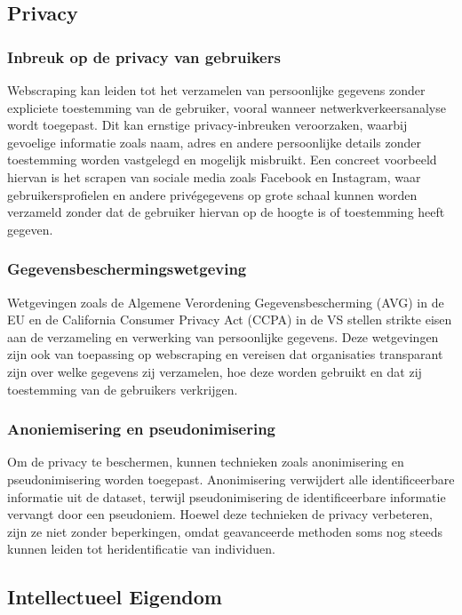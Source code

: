 \subsection{Privacy}
\subsubsection{Inbreuk op de privacy van gebruikers}
Webscraping kan leiden tot het verzamelen van persoonlijke gegevens zonder expliciete toestemming van de gebruiker, vooral wanneer netwerkverkeersanalyse wordt toegepast. Dit kan ernstige privacy-inbreuken veroorzaken, waarbij gevoelige informatie zoals naam, adres en andere persoonlijke details zonder toestemming worden vastgelegd en mogelijk misbruikt. Een concreet voorbeeld hiervan is het scrapen van sociale media zoals Facebook en Instagram, waar gebruikersprofielen en andere privégegevens op grote schaal kunnen worden verzameld zonder dat de gebruiker hiervan op de hoogte is of toestemming heeft gegeven.


\subsubsection{Gegevensbeschermingswetgeving}
Wetgevingen zoals de Algemene Verordening Gegevensbescherming (AVG) in de EU en de California Consumer Privacy Act (CCPA) in de VS stellen strikte eisen aan de verzameling en verwerking van persoonlijke gegevens. Deze wetgevingen zijn ook van toepassing op webscraping en vereisen dat organisaties transparant zijn over welke gegevens zij verzamelen, hoe deze worden gebruikt en dat zij toestemming van de gebruikers verkrijgen.

\subsubsection{Anoniemisering en pseudonimisering}
Om de privacy te beschermen, kunnen technieken zoals anonimisering en pseudonimisering worden toegepast. Anonimisering verwijdert alle identificeerbare informatie uit de dataset, terwijl pseudonimisering de identificeerbare informatie vervangt door een pseudoniem. Hoewel deze technieken de privacy verbeteren, zijn ze niet zonder beperkingen, omdat geavanceerde methoden soms nog steeds kunnen leiden tot heridentificatie van individuen.

\subsection{Intellectueel Eigendom}
